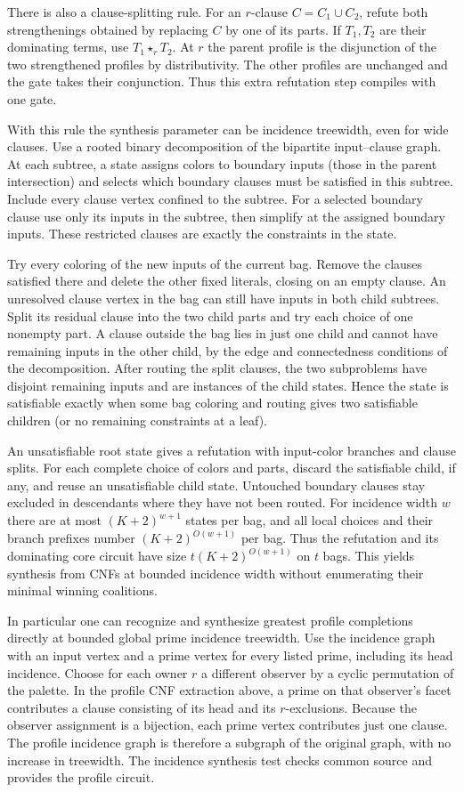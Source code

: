 There is also a clause-splitting rule. For an $r$-clause
$C=C_1\cup C_2$, refute both strengthenings obtained by
replacing $C$ by one of its parts. If $T_1,T_2$ are their
dominating terms, use $T_1\star_r T_2$. At $r$ the parent
profile is the disjunction of the two strengthened
profiles by distributivity. The other profiles are
unchanged and the gate takes their conjunction. Thus
this extra refutation step compiles with one gate.

With this rule the synthesis parameter can be incidence
treewidth, even for wide clauses. Use a rooted binary
decomposition of the bipartite input--clause graph.
At each subtree, a state assigns colors to boundary
inputs (those in the parent intersection) and selects
which boundary clauses must be satisfied in this subtree.
Include every clause vertex confined to the subtree.
For a selected boundary clause use only its inputs in
the subtree, then simplify at the assigned boundary
inputs. These restricted clauses are exactly the
constraints in the state.

Try every coloring of the new inputs of the current
bag. Remove the clauses satisfied there and delete
the other fixed literals, closing on an empty clause.
An unresolved clause vertex in the bag can still have
inputs in both child subtrees. Split its residual
clause into the two child parts and try each choice of
one nonempty part. A clause outside the bag lies in
just one child and cannot have remaining inputs in
the other child, by the edge and connectedness
conditions of the decomposition. After routing the
split clauses, the two subproblems have disjoint
remaining inputs and are instances of the child
states. Hence the state is satisfiable exactly when
some bag coloring and routing gives two satisfiable
children (or no remaining constraints at a leaf).

An unsatisfiable root state gives a refutation with
input-color branches and clause splits. For each
complete choice of colors and parts, discard the
satisfiable child, if any, and reuse an unsatisfiable
child state. Untouched boundary clauses stay excluded
in descendants where they have not been routed.
For incidence width $w$ there are at most
$(K+2)^{w+1}$ states per bag, and all local choices
and their branch prefixes number $(K+2)^{O(w+1)}$
per bag. Thus the refutation and its dominating core
circuit have size $t(K+2)^{O(w+1)}$ on $t$ bags.
This yields synthesis from CNFs at bounded incidence
width without enumerating their minimal winning
coalitions.

In particular one can recognize and synthesize greatest
profile completions directly at bounded global prime
incidence treewidth. Use the incidence graph with an
input vertex and a prime vertex for every listed prime,
including its head incidence. Choose for each owner $r$
a different observer by a cyclic permutation of the
palette. In the profile CNF extraction above, a prime
on that observer's facet contributes a clause consisting
of its head and its $r$-exclusions. Because the observer
assignment is a bijection, each prime vertex contributes
just one clause. The profile incidence graph is therefore
a subgraph of the original graph, with no increase in
treewidth. The incidence synthesis test checks common
source and provides the profile circuit.

